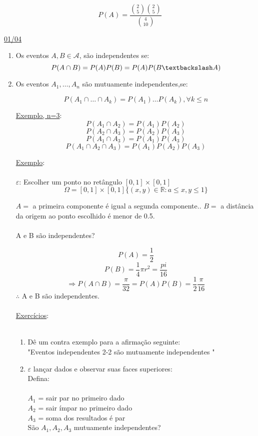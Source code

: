 \documentclass[a4paper,12pt]{article}
\begin{document}
$$P(A)=\frac{\binom{2}{5}\binom{2}{5}}{\binom{4}{10}} $$

\newpage

\underline{01/04}

\begin{enumerate}[label=\alph*)]
	\item Os eventos $A,B\in \mathscr{A} $, são independentes se:
	$$P(A\cap B)=P(A)P(B)=P(A)P(B\textbackslash A) $$
	
	\item Os eventos $A_1,\ldots,A_n$ são mutuamente independentes,se:
	
	$$P(A_1\cap \ldots \cap A_k)=P(A_1)\ldots P(A_k), \forall k\le n $$

\underline{Exemplo, n=3}:
$$P(A_1\cap A_2)=P(A_1)P(A_2) $$
$$P(A_2\cap A_3)=P(A_2)P(A_3) $$
$$P(A_1\cap A_3)=P(A_1)P(A_3) $$
$$P(A_1\cap A_2\cap A_3)= P(A_1)P(A_2)P(A_3) $$

\underline{Exemplo}:\\
\\
$\varepsilon$: Escolher um ponto no retângulo $ [0,1]\times [0,1]$
$$\Omega = [0,1]\times [0,1] \{(x,y)\in \mathbb{R}: a\le x,y\le 1 \}$$

$A=$ a primeira componente é igual a segunda componente..
$B=$ a distância da origem ao ponto escolhido é menor de 0.5.\\
\\
A e B são independentes?

$$P(A) = \frac{1}{2} $$
$$P(B)=\frac{1}{4}\pi r^2=\frac{pi}{16}$$
$$\Rightarrow P(A\cap B)= \frac{\pi}{32}=P(A)P(B) =\frac{1}{2} \frac{\pi}{16}$$
$\therefore $ A e B são independentes.\\
\\


\underline{Exercícios}:\\ 
\\
\begin{enumerate}
	\item Dê um contra exemplo para a afirmação seguinte:\\
  "Eventos independentes 2-2 são mutuamente independentes  "
  \item $\varepsilon$ lançar dados e observar suas faces superiores:\\
  Defina:\\
  \\
  $A_1$ = sair par no primeiro dado\\
  $A_2$ = sair ímpar no primeiro dado\\
  $A_3$ = soma dos resultados é par\\
  São $A_1,A_2,A_3$ mutuamente independentes?
\end{enumerate}

\end{enumerate}
\end{document}
